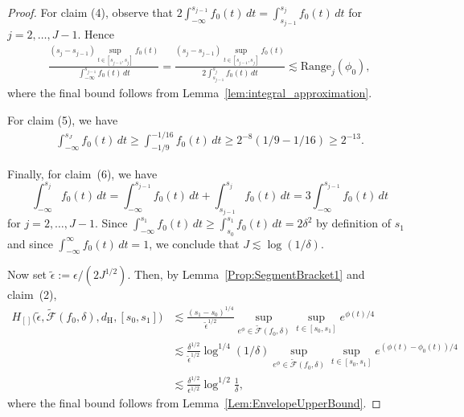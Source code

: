 \documentclass[a4paper,12pt]{article}
\begin{document}
\begin{proof}
  For claim (4), observe that $2 \int_{-\infty}^{s_{j-1}} f_0(t) \, dt = \int_{s_{j-1}}^{s_j} f_0(t) \, dt$ for $j=2,\ldots,J-1$. Hence
  \begin{align*}
    \frac{(s_j - s_{j-1}) \sup_{t \in [s_{j-1}, s_j]} f_0(t) }{\int_{-\infty}^{s_{j-1}} f_0(t) \, dt } =
    \frac{(s_j - s_{j-1}) \sup_{t \in [s_{j-1}, s_j]} f_0(t) }{2 \int_{s_{j-1}}^{s_j} f_0(t) \, dt } 
    \lesssim \mathrm{Range}_j(\phi_0),
  \end{align*}
  where the final bound follows from Lemma~\ref{lem:integral_approximation}.

  For claim (5), we have 
\begin{align*}
\int_{-\infty}^{s_J} f_0(t) \, dt \geq \int_{-1/9}^{-1/16} f_0(t) \, dt \geq 2^{-8}(1/9-1/16) \geq 2^{-13}.
\end{align*}

 Finally, for claim~(6), we have 
\[
\int_{-\infty}^{s_j} f_0(t) \, dt = \int_{-\infty}^{s_{j-1}} f_0(t) \, dt + \int_{s_{j-1}}^{s_j} f_0(t) \, dt = 3  \int_{-\infty}^{s_{j-1}} f_0(t) \, dt
\]
for $j=2,\ldots,J-1$. Since $\int_{-\infty}^{s_1} f_0(t) \, dt \geq \int_{s_0}^{s_1} f_0(t) \, dt = 2\delta^2$ by definition of $s_1$ and since $\int_{-\infty}^\infty f_0(t) \, dt = 1$, we conclude that $J \lesssim \log(1/\delta)$.

  Now set $\tilde{\epsilon} := \epsilon/(2J^{1/2})$.  Then, by Lemma~\ref{Prop:SegmentBracket1} and claim~(2),
  \begin{align}
\label{Eq:s0}
    H_{[]}\bigl(\tilde{\epsilon}, \tilde{\mathcal{F}}(f_0, \delta), d_{\mathrm{H}}, [s_0, s_1]\bigr)
    &\lesssim \frac{(s_1 - s_0)^{1/4}}{\tilde{\epsilon}^{1/2}}\sup_{e^\phi \in \tilde{\mathcal{F}}(f_0, \delta) }\sup_{t \in [s_0, s_1]} e^{\phi(t)/4} \nonumber \\
    &\lesssim \frac{\delta^{1/2}}{\tilde{\epsilon}^{1/2}} \log^{1/4}(1/\delta)\sup_{e^\phi \in \tilde{\mathcal{F}}(f_0, \delta) }\sup_{t \in [s_0, s_1]} e^{(\phi(t) - \phi_0(t))/4} \nonumber \\
    &\lesssim  \frac{\delta^{1/2}}{\epsilon^{1/2}} \log^{1/2} \frac{1}{\delta},
  \end{align}
where the final bound follows from Lemma~\ref{Lem:EnvelopeUpperBound}.


\end{proof}
\end{document}
